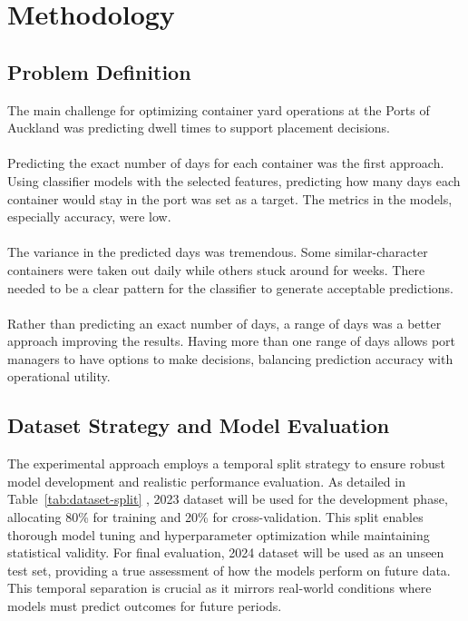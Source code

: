 \chapter{Methodology}%


	\section{Problem Definition}
		The main challenge for optimizing container yard operations at the Ports of Auckland was predicting dwell times
		to support placement decisions.
		\\
		\\
		Predicting the exact number of days for each container was the first approach. Using classifier models with the
		selected features, predicting how many days each container would stay in the port was set as a target. The
		metrics in the models, especially accuracy, were low.
		\\
		\\
		The variance in the predicted days was tremendous. Some similar-character containers were taken out daily while
		others stuck around for weeks. There needed to be a clear pattern for the classifier to generate acceptable
		predictions.
		\\
		\\
		Rather than predicting an exact number of days, a range of days was a better approach improving the results.
		Having more than one range of days allows port managers to have options to make decisions, balancing prediction
		accuracy with operational utility.


	\section{Dataset Strategy and Model Evaluation}

		The experimental approach employs a temporal split strategy to ensure robust model development and realistic
		performance evaluation. As detailed in Table~\ref{tab:dataset-split}
		, 2023 dataset will be used for the development phase, allocating 80\% for training and 20\%
		for cross-validation. This split enables thorough model tuning and hyperparameter optimization while
		maintaining statistical validity. For final evaluation, 2024 dataset will be used as an unseen test
		set, providing a true assessment of how the models perform on future data. This temporal separation is
		crucial as it mirrors real-world conditions where models must predict outcomes for future periods.

